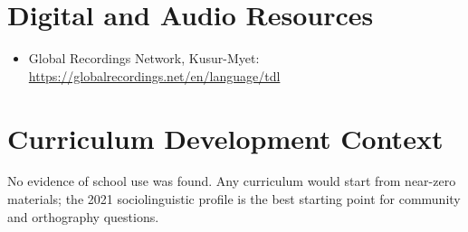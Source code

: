 \documentclass[12pt]{article}
\begin{document}
\section{Digital and Audio Resources}
\begin{itemize}
\item Global Recordings Network, Kusur-Myet: \url{https://globalrecordings.net/en/language/tdl}
\end{itemize}
\section{Curriculum Development Context}
No evidence of school use was found. Any curriculum would start from near-zero materials; the 2021 sociolinguistic profile is the best starting point for community and orthography questions.
\end{document}
